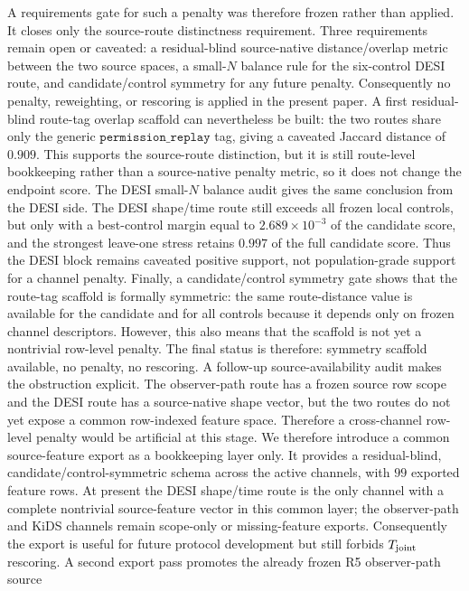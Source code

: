 A requirements gate for such a penalty was therefore frozen rather than
applied.  It closes only the source-route distinctness requirement.  Three
requirements remain open or caveated: a residual-blind source-native
distance/overlap metric between the two source spaces, a small-\(N\) balance
rule for the six-control DESI route, and candidate/control symmetry for any
future penalty.  Consequently no penalty, reweighting, or rescoring is applied
in the present paper.
A first residual-blind route-tag overlap scaffold can nevertheless be built:
the two routes share only the generic \(\texttt{permission\_replay}\) tag,
giving a caveated Jaccard distance of \(0.909\).  This supports the
source-route distinction, but it is still route-level bookkeeping rather than
a source-native penalty metric, so it does not change the endpoint score.
The DESI small-\(N\) balance audit gives the same conclusion from the DESI
side.  The DESI shape/time route still exceeds all frozen local controls, but
only with a best-control margin equal to \(2.689\times10^{-3}\) of the
candidate score, and the strongest leave-one stress retains \(0.997\) of the
full candidate score.  Thus the DESI block remains caveated positive support,
not population-grade support for a channel penalty.
Finally, a candidate/control symmetry gate shows that the route-tag scaffold
is formally symmetric: the same route-distance value is available for the
candidate and for all controls because it depends only on frozen channel
descriptors.  However, this also means that the scaffold is not yet a
nontrivial row-level penalty.  The final status is therefore: symmetry
scaffold available, no penalty, no rescoring.
A follow-up source-availability audit makes the obstruction explicit.  The
observer-path route has a frozen source row scope and the DESI route has a
source-native shape vector, but the two routes do not yet expose a common
row-indexed feature space.  Therefore a cross-channel row-level penalty would
be artificial at this stage.
We therefore introduce a common source-feature export as a bookkeeping layer
only.  It provides a residual-blind, candidate/control-symmetric schema across
the active channels, with \(99\) exported feature rows.  At present the DESI
shape/time route is the only channel with a complete nontrivial source-feature
vector in this common layer; the observer-path and KiDS channels remain
scope-only or missing-feature exports.  Consequently the export is useful for
future protocol development but still forbids \(T_{\rm joint}\) rescoring.
A second export pass promotes the already frozen R5 observer-path source
